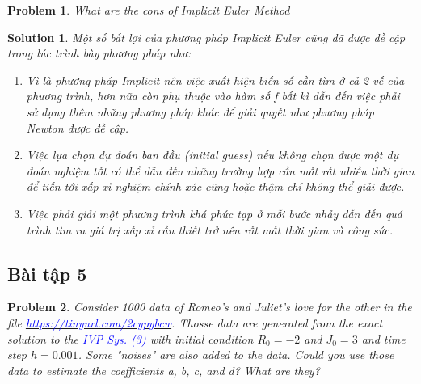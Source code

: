 \documentclass[a4paper]{article}
\newtheorem*{problem}{Problem}
\newtheorem*{sol}{Solution}
\begin{document}
\begin{problem}
    What are the cons of Implicit Euler Method
\end{problem}
\begin{sol}
    Một số bất lợi của phương pháp Implicit Euler cũng đã được đề cập trong lúc trình bày phương pháp như: 
    \begin{enumerate}
        \item Vì là phương pháp Implicit nên việc xuất hiện biến số cần tìm ở cả 2 vế của phương trình, hơn nữa còn phụ thuộc vào hàm số f bất kì dẫn đến việc phải sử dụng thêm những phương pháp khác để giải quyết như phương pháp Newton được đề cập.
        \item Việc lựa chọn dự đoán ban đầu (initial guess) nếu không chọn được một dự đoán nghiệm tốt có thể dẫn đến những trường hợp cần mất rất nhiều thời gian để tiến tới xấp xỉ nghiệm chính xác cũng hoặc thậm chí không thể giải được.
        \item Việc phải giải một phương trình khá phức tạp ở mỗi bước nhảy dẫn đến quá trình tìm ra giá trị xấp xỉ cần thiết trở nên rất mất thời gian và công sức.
    \end{enumerate}
\end{sol}
	
\subsection{Bài tập 5}
\begin{problem}
Consider 1000 data of Romeo's and Juliet's love for the other in the file
\newline \href{https://drive.google.com/drive/folders/16ByfLXtAn8idOJhrH445TNt4oNoD7XDE}{\textcolor{blue}{https://tinyurl.com/2cypybcw}}. Thosse data are generated from the exact solution to the \textcolor{blue}{IVP Sys. (3)} with initial condition $R_0 = -2$ and $J_0 = 3$ and time step $h = 0.001$. Some "noises" are also added to the data. Could you use those data to estimate the coefficients a, b, c, and d? What
are they?  
\end{problem}

\\
\\
\\
\end{document}
